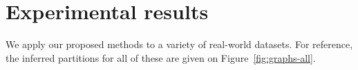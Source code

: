 \section{Experimental results}
\label{sec:experiments}

We apply our proposed methods to a variety of real-world datasets.
For reference, the inferred partitions for all of these are given on Figure~\ref{fig:graphs-all}.
